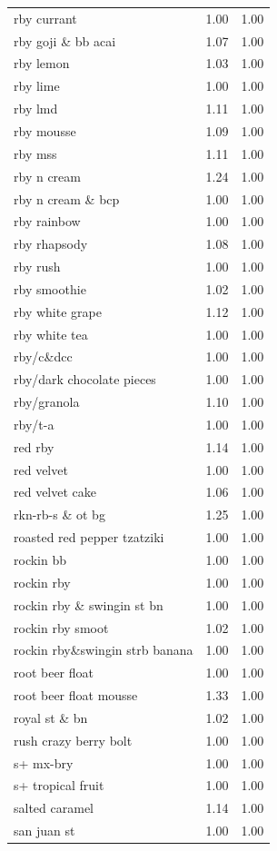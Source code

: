 \begin{table}
\begin{tabular}{lrr}
rby currant & 1.00 & 1.00 \\
rby goji \& bb acai & 1.07 & 1.00 \\
rby lemon & 1.03 & 1.00 \\
rby lime & 1.00 & 1.00 \\
rby lmd & 1.11 & 1.00 \\
rby mousse & 1.09 & 1.00 \\
rby mss & 1.11 & 1.00 \\
rby n cream & 1.24 & 1.00 \\
rby n cream \& bcp & 1.00 & 1.00 \\
rby rainbow & 1.00 & 1.00 \\
rby rhapsody & 1.08 & 1.00 \\
rby rush & 1.00 & 1.00 \\
rby smoothie & 1.02 & 1.00 \\
rby white grape & 1.12 & 1.00 \\
rby white tea & 1.00 & 1.00 \\
rby/c\&dcc & 1.00 & 1.00 \\
rby/dark chocolate pieces & 1.00 & 1.00 \\
rby/granola & 1.10 & 1.00 \\
rby/t-a & 1.00 & 1.00 \\
red rby & 1.14 & 1.00 \\
red velvet & 1.00 & 1.00 \\
red velvet cake & 1.06 & 1.00 \\
rkn-rb-s \& ot bg & 1.25 & 1.00 \\
roasted red pepper tzatziki & 1.00 & 1.00 \\
rockin bb & 1.00 & 1.00 \\
rockin rby & 1.00 & 1.00 \\
rockin rby \& swingin st bn & 1.00 & 1.00 \\
rockin rby smoot & 1.02 & 1.00 \\
rockin rby\&swingin strb banana & 1.00 & 1.00 \\
root beer float & 1.00 & 1.00 \\
root beer float mousse & 1.33 & 1.00 \\
royal st \& bn & 1.02 & 1.00 \\
rush crazy berry bolt & 1.00 & 1.00 \\
s+ mx-bry & 1.00 & 1.00 \\
s+ tropical fruit & 1.00 & 1.00 \\
salted caramel & 1.14 & 1.00 \\
san juan st & 1.00 & 1.00 \\

\end{tabular}
\end{table}
